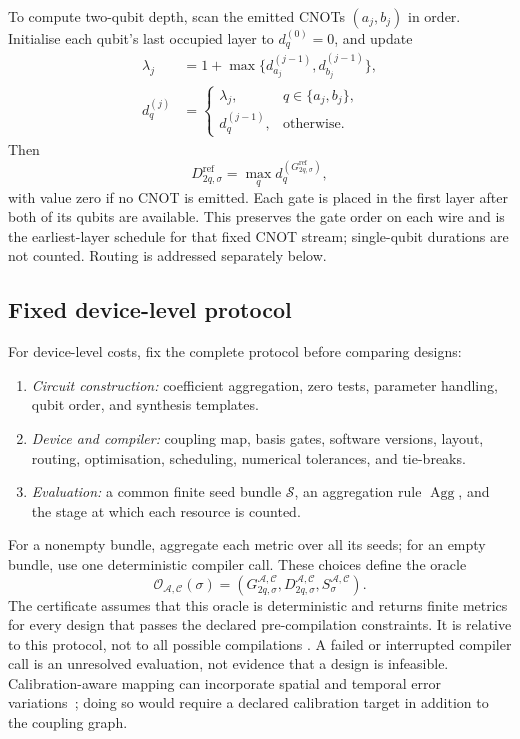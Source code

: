 \documentclass[a4paper,onecolumn,11pt,unpublished]{quantumarticle}
\theoremstyle{remark}
\begin{document}
To compute two-qubit depth, scan the emitted CNOTs $(a_j,b_j)$ in order.
Initialise each qubit's last occupied layer to $d_q^{(0)}=0$, and update
\begin{align}
\lambda_j&=1+\max\{d_{a_j}^{(j-1)},d_{b_j}^{(j-1)}\},
\label{eq:reference-asap-layer}\\
d_q^{(j)}&=\begin{cases}
\lambda_j,&q\in\{a_j,b_j\},\\
d_q^{(j-1)},&\text{otherwise}.
\end{cases}
\label{eq:reference-asap-update}
\end{align}
Then
\begin{equation}
D_{2q,\sigma}^{\mathrm{ref}}=\max_q d_q^{(G_{2q,\sigma}^{\mathrm{ref}})},
\label{eq:reference-depth}
\end{equation}
with value zero if no CNOT is emitted.  Each gate is placed in the first
layer after both of its qubits are available.  This preserves the gate order
on each wire and is the earliest-layer schedule for that fixed CNOT stream;
single-qubit durations are not counted.  Routing is addressed separately below.

\subsection{Fixed device-level protocol}
\label{app:hardware-compiler-protocol}

For device-level costs, fix the complete protocol before comparing designs:
\begin{enumerate}
\item \emph{Circuit construction:} coefficient aggregation, zero tests,
parameter handling, qubit order, and synthesis templates.
\item \emph{Device and compiler:} coupling map, basis gates, software versions,
layout, routing, optimisation, scheduling, numerical tolerances, and tie-breaks.
\item \emph{Evaluation:} a common finite seed bundle $\mathcal S$, an aggregation
rule $\operatorname{Agg}$, and the stage at which each resource is counted.
\end{enumerate}
For a nonempty bundle, aggregate each metric over all its seeds; for an empty
bundle, use one deterministic compiler call.  These choices define the oracle
\begin{equation}
\mathcal O_{\mathcal A,\mathcal C}(\sigma)
=(G_{2q,\sigma}^{\mathcal A,\mathcal C},
D_{2q,\sigma}^{\mathcal A,\mathcal C},S_\sigma^{\mathcal A,\mathcal C}).
\label{eq:deterministic-compiler-oracle}
\end{equation}
The certificate assumes that this oracle is deterministic and returns finite
metrics for every design that passes the declared pre-compilation constraints.
It is relative to this protocol, not to all possible compilations
\cite{Weidenfeller2022,Schmidbauer2024}.  A failed or interrupted compiler call
is an unresolved evaluation, not evidence that a design is infeasible.
Calibration-aware mapping can incorporate spatial and temporal error
variations~\cite{Murali2019}; doing so would require a declared
calibration target in addition to the coupling graph.
\end{document}
